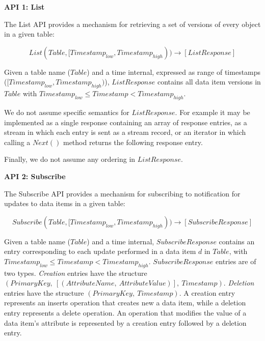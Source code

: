 \bigskip
\noindent
\textbf{API 1: List}

\noindent
The List API provides a mechanism for retrieving a set of versions of every object in a given table:

\[
  List(Table, [Timestamp_{low}, Timestamp_{high})) \rightarrow [ListResponse]
\]

\noindent
\begin{sloppypar}
Given a table name ($Table$) and a time internal, expressed as range of timestamps ($[Timestamp_{low}, Timestamp_{high})$),
$ListResponse$ contains all data item versions in $Table$ with $Timestamp_{low} \leq Timestamp < Timestamp_{high}$.
\end{sloppypar}

We do not assume specific semantics for $ListResponse$.
For example it may be implemented as a single response containing an array of response entries,
as a stream in which each entry is sent as a stream record,
or an iterator in which calling a $Next()$ method returns the following response entry.

Finally, we do not assume any ordering in $ListResponse$.



\bigskip
\noindent
\textbf{API 2: Subscribe}

\noindent
The Subscribe API provides a mechanism for subscribing to notification for updates to data items in a given table:

\[
  Subscribe(Table, [Timestamp_{low}, Timestamp_{high})) \rightarrow [SubscribeResponse]
\]

\noindent
\begin{sloppypar}
Given a table name ($Table$) and a time internal,
$SubscribeResponse$ contains an entry corresponding to each update performed in a data item $d$ in $Table$, with
$Timestamp_{low} \leq Timestamp < Timestamp_{high}$.
$SubscribeResponse$ entries are of two types.
\textit{Creation} entries have the structure $(PrimaryKey,~[(AttributeName,~AttributeValue)],~Timestamp)$.
\textit{Deletion} entries have the structure $(PrimaryKey,~Timestamp)$.
A creation entry represents an inserts operation that creates new a data item,
while a deletion entry represents a delete operation.
An operation that modifies the value of a data item's attribute is represented by a creation entry followed by a deletion
entry.
\end{sloppypar}

